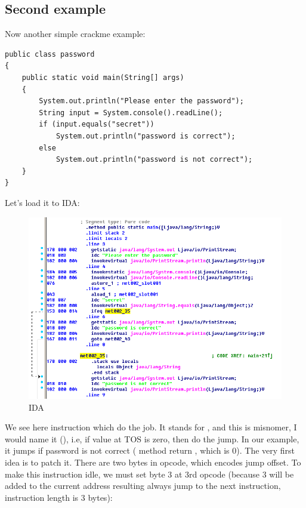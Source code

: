 \subsection{Second example}

Now another simple crackme example:

\begin{lstlisting}
public class password
{
	public static void main(String[] args)
	{
		System.out.println("Please enter the password");
		String input = System.console().readLine();
		if (input.equals("secret"))
			System.out.println("password is correct");
		else
			System.out.println("password is not correct");
	}
}
\end{lstlisting}

Let's load it to IDA:

\begin{figure}[H]
\centering
\includegraphics[scale=\FigScale]{Java_and_NET/java/13_patching/2/1.png}
\caption{IDA}
\end{figure}

We see here  instruction which do the job.
It stands for , and this is misnomer, I would name it  (), i.e, 
if value at \ac{TOS} is zero, then do the jump.
In our example, it jumps if password is not correct ( method return , which is 0).
The very first idea is to patch it.
There are two bytes in  opcode, which encodes jump offset.
To make this instruction idle, we must set byte 3 at 3rd opcode
(because 3 will be added to the current address resulting always jump to the next instruction,
 instruction length is 3 bytes):

